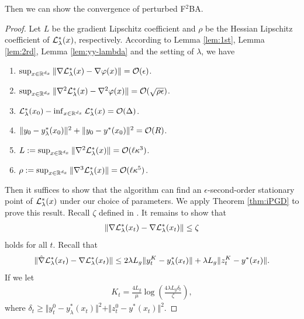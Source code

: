 Then we can show the convergence of perturbed F${}^2$BA.
\thmPFBA*
\begin{proof}
Let $L$ be the gradient Lipschitz coefficient and $\rho$ be the Hessian Lipschitz coefficient of ${\mathcal{L}}_{\lambda}^*(x)$, respectively.
According to Lemma \ref{lem:1st}, Lemma \ref{lem:2rd}, Lemma \ref{lem:yy-lambda}  and the setting of $\lambda$, we have
\begin{enumerate}[label=\alph*.]
    \item $\sup_{x \in {\mathbb{R}}^{d_x}} \Vert \nabla {\mathcal{L}}_{\lambda}^*(x) - \nabla \varphi(x) \Vert = {\mathcal{O}}(\epsilon)$. 
    \item $\sup_{x \in {\mathbb{R}}^{d_x}} \Vert \nabla^2 {\mathcal{L}}_{\lambda}^*(x) - \nabla^2 \varphi(x) \Vert = {\mathcal{O}}(\sqrt{\rho \epsilon})$.
    \item ${\mathcal{L}}_{\lambda}^*(x_0) - \inf_{x \in {\mathbb{R}}^{d_x}}  {\mathcal{L}}_{\lambda}^*(x) = {\mathcal{O}}(\Delta)$.
    \item $\Vert y_0 - y_{\lambda}^*(x_0) \Vert^2 + \Vert y_0 - y^*(x_0) \Vert^2 ={\mathcal{O}}(R)$.
    \item $ L:=\sup_{x \in {\mathbb{R}}^{d_x}}\Vert \nabla^2 {\mathcal{L}}_{\lambda}^*(x) \Vert = {\mathcal{O}}(\ell \kappa^3)$.
    \item $\rho: = \sup_{x \in {\mathbb{R}}^{d_x}} \Vert \nabla^3 {\mathcal{L}}_{\lambda}^*(x) \Vert = {\mathcal{O}}(\ell \kappa^5) $.
\end{enumerate}
Then it suffices to show that the algorithm can find an $\epsilon$-second-order stationary point of ${\mathcal{L}}_{\lambda}^*(x)$ under our choice of parameters.
We apply Theorem \ref{thm:iPGD} to prove this result. 
Recall $\zeta$ defined in .
It remains to show that 
\begin{align} \label{eq:cond}
    \Vert \nabla {\mathcal{L}}_{\lambda}^*(x_t) - \nabla {\mathcal{L}}_{\lambda}^*(x_t) \Vert \le \zeta
\end{align}
holds for all $t$. Recall that
\begin{align*}
    \Vert \hat \nabla {\mathcal{L}}_{\lambda}^*(x_t) - \nabla {\mathcal{L}}_{\lambda}^*(x_t) \Vert \le 2 \lambda L_g \Vert y_{t}^K- y_{\lambda}^*(x_t) \Vert + \lambda L_g \Vert z_{t}^K - y^*(x_t) \Vert.
\end{align*} 
 If we let
\begin{align} \label{eq:Kt}
    K_t = \frac{4 L_g}{\mu} \log \left( 
    \frac{4 \lambda L_g \delta_t}{\zeta} 
    \right), 
\end{align}
where $\delta_t \ge \Vert y_t^0 - y_{\lambda}^*(x_t) \Vert^2 + \Vert z_t^0 - y^*(x_t) \Vert^2  $.

\end{proof}
